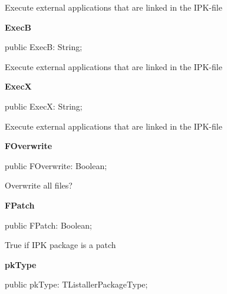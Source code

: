 \documentclass{report}
\newif\ifpdf
\begin{document}
\begin{list}{}
\begin{flushleft}
\ifpdf
\end{flushleft}
\fi


\par Execute external applications that are linked in the IPK{-}file\label{imainunit.TIWizFrm-ExecB}
\item[\textbf{ExecB}\hfill]
\ifpdf
\begin{flushleft}
\fi
\begin{ttfamily}
public ExecB: String;\end{ttfamily}

\ifpdf
\end{flushleft}
\fi


\par Execute external applications that are linked in the IPK{-}file\label{imainunit.TIWizFrm-ExecX}
\item[\textbf{ExecX}\hfill]
\ifpdf
\begin{flushleft}
\fi
\begin{ttfamily}
public ExecX: String;\end{ttfamily}

\ifpdf
\end{flushleft}
\fi


\par Execute external applications that are linked in the IPK{-}file\label{imainunit.TIWizFrm-FOverwrite}
\item[\textbf{FOverwrite}\hfill]
\ifpdf
\begin{flushleft}
\fi
\begin{ttfamily}
public FOverwrite: Boolean;\end{ttfamily}

\ifpdf
\end{flushleft}
\fi


\par Overwrite all files?\label{imainunit.TIWizFrm-FPatch}
\item[\textbf{FPatch}\hfill]
\ifpdf
\begin{flushleft}
\fi
\begin{ttfamily}
public FPatch: Boolean;\end{ttfamily}

\ifpdf
\end{flushleft}
\fi


\par True if IPK package is a patch\label{imainunit.TIWizFrm-pkType}
\item[\textbf{pkType}\hfill]
\ifpdf
\begin{flushleft}
\fi
\begin{ttfamily}
public pkType: TListallerPackageType;\end{ttfamily}

\ifpdf
\end{flushleft}
\fi


\par  \end{list}
\end{document}
